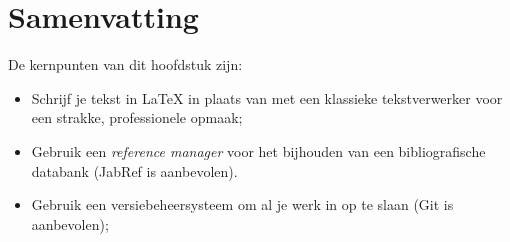 \section{Samenvatting}
\label{sec:voorbereiding-samenvatting}

De kernpunten van dit hoofdstuk zijn:

\begin{itemize}
  \item Schrijf je tekst in {\LaTeX} in plaats van met een klassieke tekstverwerker voor een strakke, professionele opmaak;
  \item Gebruik een \emph{reference manager} voor het bijhouden van een bibliografische databank (JabRef is aanbevolen).
  \item Gebruik een versiebeheersysteem om al je werk in op te slaan (Git is aanbevolen);
\end{itemize}
